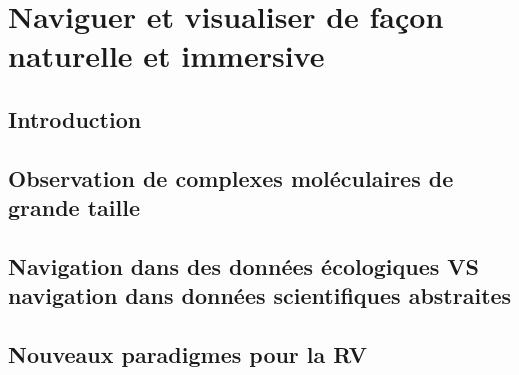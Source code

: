 \chapter[Exploration interactive de données moléculaire en immersion]{Naviguer et visualiser de façon naturelle et immersive}
\label{Sec:CantorDigitalis}
\minitoc
\cleardoublepage

\section{Introduction}

\section{Observation de complexes moléculaires de grande taille}

\section{Navigation dans des données écologiques VS navigation dans données scientifiques abstraites}

\section{Nouveaux paradigmes pour la RV}


